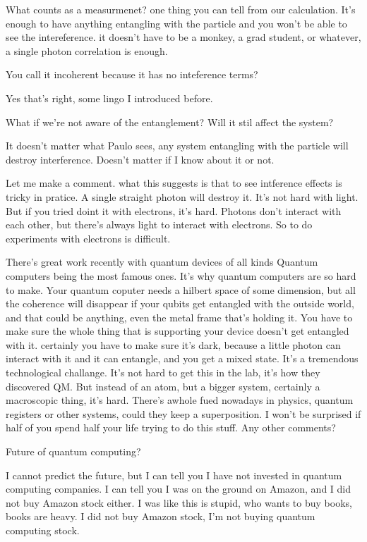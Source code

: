 What counts as a measurmenet?
one thing you can tell from our calculation.
It's enough to have anything entangling with the particle and you won't be able
to see the intereference.
it doesn't have to be a monkey, a grad student, or whatever,
a single photon correlation is enough.

\begin{question}
    You call it incoherent because it has no inteference terms?
\end{question}
Yes that's right, some lingo I introduced before.

\begin{question}
    What if we're not aware of the entanglement?
    Will it stil affect the system?
\end{question}
It doesn't matter what Paulo sees,
any system entangling with the particle will destroy interference.
Doesn't matter if I know about it or not.


Let me make a comment.
what this suggests is that to see intference effects is tricky in pratice.
A single straight photon will destroy it.
It's not hard with light.
But if you tried doint it with electrons,
it's hard.
Photons don't interact with each other,
but there's always light to interact with electrons.
So to do experiments with electrons is difficult.

There's great work recently with quantum devices of all kinds
Quantum computers being the most famous ones.
It's why quantum computers are so hard to make.
Your quantum coputer needs a hilbert space of some dimension,
but all the coherence will disappear if your qubits get entangled with the
outside world,
and that could be anything,
even the metal frame that's holding it.
You have to make sure the whole thing that is supporting your device doesn't get
entangled with it.
certainly you have to make sure it's dark,
because a little photon can interact with it and it can entangle,
and you get a mixed state.
It's a tremendous technological challange.
It's not hard to get this in the lab,
it's how they discovered QM.
But instead of an atom,
but a bigger system,
certainly a macroscopic thing,
it's hard.
There's awhole fued nowadays in physics,
quantum registers or other systems,
could they keep a superposition.
I won't be surprised if half of you spend half your life trying to do this
stuff.
Any other comments?

\begin{question}
    Future of quantum computing?
\end{question}
I cannot predict the future,
but I can tell you
I have not invested in quantum computing companies.
I can tell you I was on the ground on Amazon,
and I did not buy Amazon stock either.
I was like this is stupid,
who wants to buy books,
books are heavy.
I did not buy Amazon stock,
I'm not buying quantum computing stock.

